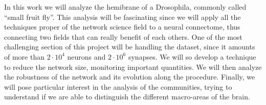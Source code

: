 In this work we will analyze the hemibrane of a Drosophila, commonly called “small fruit fly”.
This analysis will be fascinating since we will apply all the techniques proper of the 
network science field to a neural connectome, thus connecting two fields that can really 
benefit of each others. One of the most challenging section of this project will be handling
the dataset, since it amounts of more than $2\cdot10^{4}$ neurons and $2\cdot10^6$ synapses.
We will so develop a technique to reduce the network size, monitoring important quantities. 
We will then analyze the robustness of the network and its evolution along the 
procedure.
Finally, we will pose particular interest in the analysis of the communities, trying to understand 
if we are able to distinguish the different macro-areas of the brain.